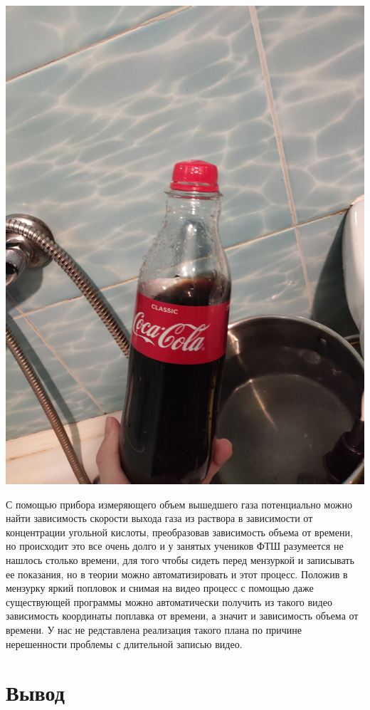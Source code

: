 \documentclass[12pt,a4paper]{scrartcl}
\begin{document}
\begin{flushleft}
\includegraphics[scale=0.2]{Boom}
\end{flushleft}

С помощью прибора измеряющего объем вышедшего газа потенциально можно найти зависимость скорости выхода газа из раствора в зависимости от концентрации угольной кислоты, преобразовав зависимость объема от времени, но происходит это все очень долго и у занятых учеников ФТШ разумеется не нашлось столько времени, для того чтобы сидеть перед мензуркой и записывать ее показания, но в теории можно автоматизировать и этот процесс. Положив в мензурку яркий попловок и снимая на видео процесс с помощью даже существующей программы можно автоматически получить из такого видео зависимость координаты поплавка от времени, а значит и зависимость объема от времени. У нас не редставлена реализация такого плана по причине нерешенности проблемы с длительной записью видео.

\section{Вывод}
\end{document}
